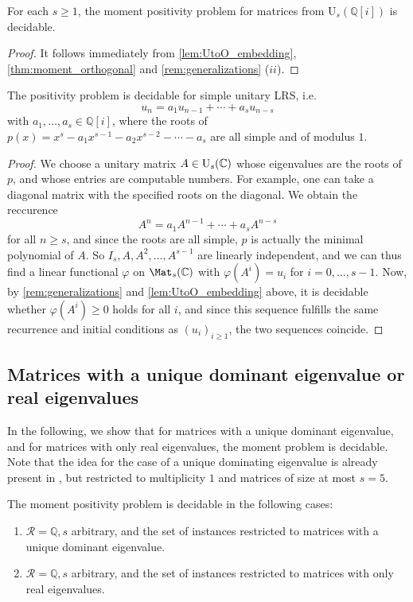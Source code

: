 \begin{corollary}
\label{cor:moment_unitary}
For each $s\geqslant 1$, the moment positivity problem for matrices from $\mathrm{U}_s(\mathbb Q[i])$ is decidable.
\end{corollary}
\begin{proof}
It follows immediately from \cref{lem:UtoO_embedding}, \cref{thm:moment_orthogonal} and \cref{rem:generalizations} ($ii$).
\end{proof}


\begin{corollary}
The positivity problem is decidable for simple unitary LRS, i.e.\
$$
u_n = a_1 u_{n-1} + \cdots + a_s u_{n-s}
$$
with $a_1, \ldots, a_s \in \mathbb{Q}[i]$, where the roots of $p(x) = x^s - a_1 x^{s-1} - a_2 x^{s-2} - \cdots - a_{s}$
are all simple and of modulus $1$.
\end{corollary}
\begin{proof}
We choose a unitary matrix $A\in{\rm U}_s(\mathbb C)$ whose eigenvalues are the roots of $p$, and whose entries are computable numbers. For example, one can take a diagonal matrix with the specified roots on the diagonal. We obtain the reccurence $$A^n=a_1A^{n-1}+\cdots + a_s A^{n-s}$$ for all $n\geqslant s$, and since the roots are all simple, $p$ is actually the minimal polynomial of $A$. So $I_s,A,A^2,\ldots, A^{s-1}$ are linearly independent, and we can thus find a linear functional $\varphi$ on $\Mat_s(\mathbb C)$ with $\varphi(A^i)=u_i$ for $i=0,\ldots, s-1$. Now, by \cref{rem:generalizations} and \cref{lem:UtoO_embedding} above, it is decidable whether $\varphi(A^i)\geqslant 0$ holds for all $i$, and since this sequence fulfills the same  recurrence and initial conditions as $(u_i)_{i\geqslant 1}$, the two sequences coincide.\end{proof}

\subsection{Matrices with a unique dominant eigenvalue or real eigenvalues}
\label{ssec:largestEigenvalue}

In the following, we show that for matrices with a unique  dominant eigenvalue, and  for matrices with only real eigenvalues, the moment problem is decidable. Note that the idea for the case of a unique dominating eigenvalue is already present in \cite{OW}, but restricted to  multiplicity $1$ and matrices of size at most $s=5$.
\begin{theorem} 
\label{thm:moment_decidable}
The moment positivity problem is decidable in the following cases:

\begin{enumerate}[label=$(\roman*)$]
	\item\label{cond:moment_dec1} $\mathcal R=\mathbb Q, s$ arbitrary, and the set of instances restricted to matrices with a unique dominant eigenvalue. 
	\item\label{cond:moment_dec3} $\mathcal R=\mathbb Q, s$ arbitrary, and the set of instances restricted to matrices with only real eigenvalues.
\end{enumerate}
\end{theorem}

